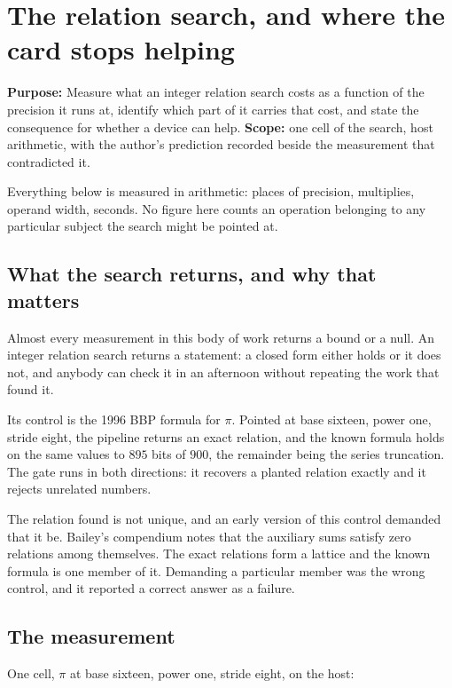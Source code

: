 \chapter{The relation search, and where the card stops helping}

\textbf{Purpose:} Measure what an integer relation search costs as a function of the precision it runs at, identify which part of it carries that cost, and state the consequence for whether a device can help. \textbf{Scope:} one cell of the search, host arithmetic, with the author's prediction recorded beside the measurement that contradicted it.

Everything below is measured in arithmetic: places of precision, multiplies, operand width, seconds. No figure here counts an operation belonging to any particular subject the search might be pointed at.

\section{What the search returns, and why that matters}

Almost every measurement in this body of work returns a bound or a null. An integer relation search returns a statement: a closed form either holds or it does not, and anybody can check it in an afternoon without repeating the work that found it.

Its control is the 1996 BBP formula for \(\pi\). Pointed at base sixteen, power one, stride eight, the pipeline returns an exact relation, and the known formula holds on the same values to \(895\) bits of \(900\), the remainder being the series truncation. The gate runs in both directions: it recovers a planted relation exactly and it rejects unrelated numbers.

The relation found is not unique, and an early version of this control demanded that it be. Bailey's compendium notes that the auxiliary sums satisfy zero relations among themselves. The exact relations form a lattice and the known formula is one member of it. Demanding a particular member was the wrong control, and it reported a correct answer as a failure.

\section{The measurement}

One cell, \(\pi\) at base sixteen, power one, stride eight, on the host:

